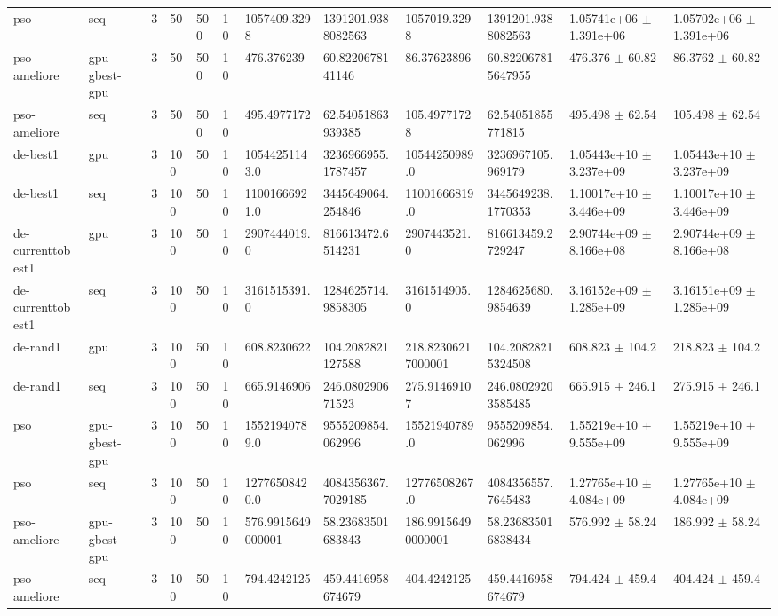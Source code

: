 \begin{table}[t]
\begin{tabular}{llllllllllll}
pso & seq & 3 & 50 & 500 & 10 & 1057409.3298 & 1391201.9388082563 & 1057019.3298 & 1391201.9388082563 & 1.05741e+06 $\pm$ 1.391e+06 & 1.05702e+06 $\pm$ 1.391e+06 \\
pso-ameliore & gpu-gbest-gpu & 3 & 50 & 500 & 10 & 476.376239 & 60.8220678141146 & 86.37623896 & 60.822067815647955 & 476.376 $\pm$ 60.82 & 86.3762 $\pm$ 60.82 \\
pso-ameliore & seq & 3 & 50 & 500 & 10 & 495.4977172 & 62.54051863939385 & 105.49771728 & 62.54051855771815 & 495.498 $\pm$ 62.54 & 105.498 $\pm$ 62.54 \\
de-best1 & gpu & 3 & 100 & 50 & 10 & 10544251143.0 & 3236966955.1787457 & 10544250989.0 & 3236967105.969179 & 1.05443e+10 $\pm$ 3.237e+09 & 1.05443e+10 $\pm$ 3.237e+09 \\
de-best1 & seq & 3 & 100 & 50 & 10 & 11001666921.0 & 3445649064.254846 & 11001666819.0 & 3445649238.1770353 & 1.10017e+10 $\pm$ 3.446e+09 & 1.10017e+10 $\pm$ 3.446e+09 \\
de-currenttobest1 & gpu & 3 & 100 & 50 & 10 & 2907444019.0 & 816613472.6514231 & 2907443521.0 & 816613459.2729247 & 2.90744e+09 $\pm$ 8.166e+08 & 2.90744e+09 $\pm$ 8.166e+08 \\
de-currenttobest1 & seq & 3 & 100 & 50 & 10 & 3161515391.0 & 1284625714.9858305 & 3161514905.0 & 1284625680.9854639 & 3.16152e+09 $\pm$ 1.285e+09 & 3.16151e+09 $\pm$ 1.285e+09 \\
de-rand1 & gpu & 3 & 100 & 50 & 10 & 608.8230622 & 104.2082821127588 & 218.82306217000001 & 104.20828215324508 & 608.823 $\pm$ 104.2 & 218.823 $\pm$ 104.2 \\
de-rand1 & seq & 3 & 100 & 50 & 10 & 665.9146906 & 246.080290671523 & 275.91469107 & 246.08029203585485 & 665.915 $\pm$ 246.1 & 275.915 $\pm$ 246.1 \\
pso & gpu-gbest-gpu & 3 & 100 & 50 & 10 & 15521940789.0 & 9555209854.062996 & 15521940789.0 & 9555209854.062996 & 1.55219e+10 $\pm$ 9.555e+09 & 1.55219e+10 $\pm$ 9.555e+09 \\
pso & seq & 3 & 100 & 50 & 10 & 12776508420.0 & 4084356367.7029185 & 12776508267.0 & 4084356557.7645483 & 1.27765e+10 $\pm$ 4.084e+09 & 1.27765e+10 $\pm$ 4.084e+09 \\
pso-ameliore & gpu-gbest-gpu & 3 & 100 & 50 & 10 & 576.9915649000001 & 58.23683501683843 & 186.99156490000001 & 58.236835016838434 & 576.992 $\pm$ 58.24 & 186.992 $\pm$ 58.24 \\
pso-ameliore & seq & 3 & 100 & 50 & 10 & 794.4242125 & 459.4416958674679 & 404.4242125 & 459.4416958674679 & 794.424 $\pm$ 459.4 & 404.424 $\pm$ 459.4 \\

\end{tabular}
\end{table}
